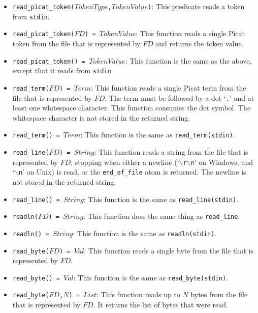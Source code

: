 \begin{itemize}
\item \texttt{read\_picat\_token($TokenType$,$TokenValue$)}: This predicate reads a token from \texttt{stdin}.
\item \texttt{read\_picat\_token($FD$) = $TokenValue$}: This function reads a single Picat token from the file that is represented by $FD$ and returns the token value.
\item \texttt{read\_picat\_token() = $TokenValue$}: This function is the same as the above, except that it reads from {\tt stdin}.
\item \texttt{read\_term($FD$) = $Term$}: This function reads a single Picat term from the file that is represented by $FD$.  The term must be followed by a dot  `\texttt{.}' and at least one whitespace character.  This function consumes the dot symbol.  The whitespace character is not stored in the returned string.
\item \texttt{read\_term() = $Term$}: This function is the same as \texttt{read\_term(stdin)}.
\item \texttt{read\_line($FD$) = $String$}: This function reads a string from the file that is represented by $FD$, stopping when either a newline (`\texttt{$\backslash$r$\backslash$n}' on Windows, and `\texttt{$\backslash$n}' on Unix) is read, or the \texttt{end\_of\_file} atom is returned.  The newline is not stored in the returned string.
\item \texttt{read\_line() = $String$}: This function is the same as \texttt{read\_line(stdin)}.
\item \texttt{readln($FD$) = $String$}: This function does the same thing as \texttt{read\_line}.
\item \texttt{readln() = $String$}: This function is the same as \texttt{readln(stdin)}.
\item \texttt{read\_byte($FD$) = $Val$}: This function reads a single byte from the file that is represented by $FD$.
\item \texttt{read\_byte() = $Val$}: This function is the same as \texttt{read\_byte(stdin)}.
\item \texttt{read\_byte($FD$,$N$) = $List$}: This function reads up to $N$ bytes from the file that is represented by $FD$.  It returns the list of bytes that were read. 

\end{itemize}
